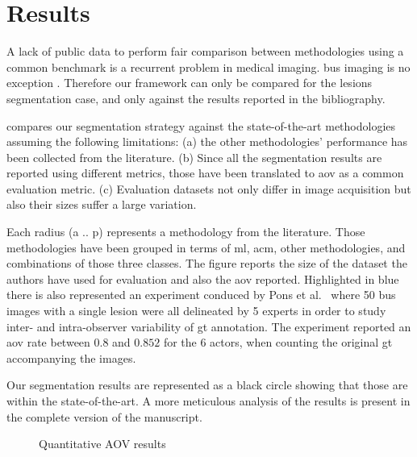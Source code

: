 \graphicspath{ {./content/results/figures/} }

\section{Results} 
A lack of public data to perform fair comparison between methodologies using a common benchmark is a recurrent problem in medical imaging.
\ac{bus} imaging is no exception \cite{Cheng:2009p10580}. 
Therefore our framework can only be compared for the lesions segmentation case, and only against the results reported in the bibliography.

 compares our segmentation strategy against the state-of-the-art methodologies assuming the following limitations:
(a) the other methodologies' performance has been collected from the literature. 
(b) Since all the segmentation results are reported using different metrics, those have been translated to \ac{aov} as a common evaluation metric.
(c) Evaluation datasets not only differ in image acquisition but also their sizes suffer a large variation. 

Each radius (a .. p) represents a methodology from the literature.
Those methodologies have been grouped in terms of \ac{ml}, \ac{acm}, other methodologies, and combinations of those three classes.
The figure reports the size of the dataset the authors have used for evaluation and also the \ac{aov} reported. 
Highlighted in blue there is also represented an experiment conduced by Pons et al.~\cite{gerard2013} where 50 \ac{bus} images with a single lesion were all delineated by 5 experts in order to study inter- and intra-observer variability of \ac{gt} annotation. 
The experiment reported an \ac{aov} rate between $0.8$ and $0.852$ for the 6 actors, when counting the original \ac{gt} accompanying the images.

Our segmentation results are represented as a black circle showing that those are within the state-of-the-art. 
A more meticulous analysis of the results is present in the complete version of the manuscript.

\begin{figure}[h]
  \centering
  
  \caption{Quantitative AOV results}
  \label{fig:surveyResults}
\end{figure}


